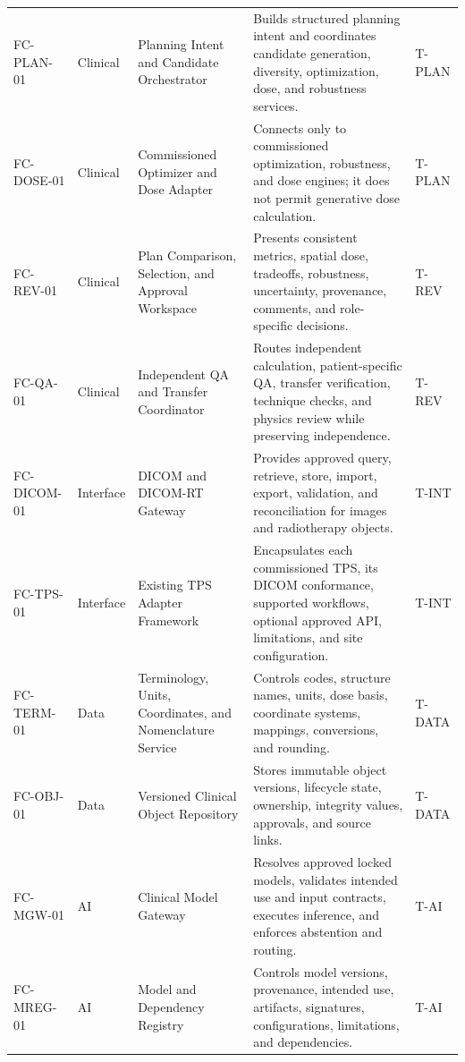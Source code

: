\documentclass[11pt,letterpaper]{article}
\begin{document}
\begin{scriptsize}
\begin{longtable}{@{}L{0.15\textwidth}L{0.11\textwidth}L{0.21\textwidth}L{0.38\textwidth}L{0.08\textwidth}@{}}
\addlinespace[2pt]
\mbox{FC-PLAN-01} & Clinical & Planning Intent and Candidate Orchestrator & Builds structured planning intent and coordinates candidate generation, diversity, optimization, dose, and robustness services. & T-PLAN \\
\addlinespace[2pt]
\mbox{FC-DOSE-01} & Clinical & Commissioned Optimizer and Dose Adapter & Connects only to commissioned optimization, robustness, and dose engines; it does not permit generative dose calculation. & T-PLAN \\
\addlinespace[2pt]
\mbox{FC-REV-01} & Clinical & Plan Comparison, Selection, and Approval Workspace & Presents consistent metrics, spatial dose, tradeoffs, robustness, uncertainty, provenance, comments, and role-specific decisions. & T-REV \\
\addlinespace[2pt]
\mbox{FC-QA-01} & Clinical & Independent QA and Transfer Coordinator & Routes independent calculation, patient-specific QA, transfer verification, technique checks, and physics review while preserving independence. & T-REV \\
\addlinespace[2pt]
\mbox{FC-DICOM-01} & Interface & DICOM and DICOM-RT Gateway & Provides approved query, retrieve, store, import, export, validation, and reconciliation for images and radiotherapy objects. & T-INT \\
\addlinespace[2pt]
\mbox{FC-TPS-01} & Interface & Existing TPS Adapter Framework & Encapsulates each commissioned TPS, its DICOM conformance, supported workflows, optional approved API, limitations, and site configuration. & T-INT \\
\addlinespace[2pt]
\mbox{FC-TERM-01} & Data & Terminology, Units, Coordinates, and Nomenclature Service & Controls codes, structure names, units, dose basis, coordinate systems, mappings, conversions, and rounding. & T-DATA \\
\addlinespace[2pt]
\mbox{FC-OBJ-01} & Data & Versioned Clinical Object Repository & Stores immutable object versions, lifecycle state, ownership, integrity values, approvals, and source links. & T-DATA \\
\addlinespace[2pt]
\mbox{FC-MGW-01} & AI & Clinical Model Gateway & Resolves approved locked models, validates intended use and input contracts, executes inference, and enforces abstention and routing. & T-AI \\
\addlinespace[2pt]
\mbox{FC-MREG-01} & AI & Model and Dependency Registry & Controls model versions, provenance, intended use, artifacts, signatures, configurations, limitations, and dependencies. & T-AI \\

\end{longtable}
\end{scriptsize}
\end{document}

